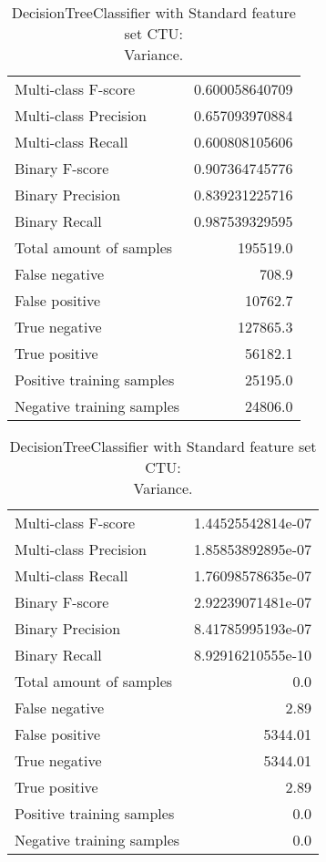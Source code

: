 \begin{table}[H]
\begin{minipage}{0.5\textwidth}
\caption{DecisionTreeClassifier with Standard feature set CTU: \\Average.}
\centering
\begin{tabular}{l r}
\toprule
Multi-class F-score & 0.600058640709 \\
Multi-class Precision & 0.657093970884 \\
Multi-class Recall & 0.600808105606 \\
\midrule
Binary F-score & 0.907364745776 \\
Binary Precision & 0.839231225716 \\
Binary Recall & 0.987539329595 \\
\midrule
Total amount of samples & 195519.0 \\
False negative & 708.9 \\
False positive & 10762.7 \\
True negative & 127865.3 \\
True positive & 56182.1 \\
\midrule
Positive training samples & 25195.0 \\
Negative training samples & 24806.0 \\
\bottomrule
\end{tabular}
\end{minipage}
\hfillx
\begin{minipage}{0.5\textwidth}
\caption{DecisionTreeClassifier with Standard feature set CTU: \\Variance.}
\centering
\begin{tabular}{l r}
\toprule
Multi-class F-score & 1.44525542814e-07 \\
Multi-class Precision & 1.85853892895e-07 \\
Multi-class Recall & 1.76098578635e-07 \\
\midrule
Binary F-score & 2.92239071481e-07 \\
Binary Precision & 8.41785995193e-07 \\
Binary Recall & 8.92916210555e-10 \\
\midrule
Total amount of samples & 0.0 \\
False negative & 2.89 \\
False positive & 5344.01 \\
True negative & 5344.01 \\
True positive & 2.89 \\
\midrule
Positive training samples & 0.0 \\
Negative training samples & 0.0 \\
\bottomrule
\end{tabular}
\end{minipage}
\end{table}


